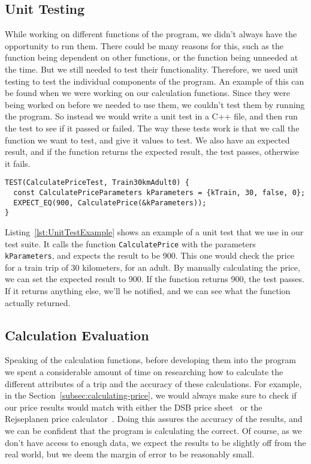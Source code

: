 \subsection{Unit Testing}\label{subsec:unit-testing}

While working on different functions of the program, we didn't always have the opportunity to run them.
There could be many reasons for this, such as the function being dependent on other functions, or the function being
unneeded at the time.
But we still needed to test their functionality.
Therefore, we used unit testing to test the individual components of the program.
An example of this can be found when we were working on our calculation functions.
Since they were being worked on before we needed to use them, we couldn't test them by running the program.
So instead we would write a unit test in a C++ file, and then run the test to see if it passed or failed.
The way these tests work is that we call the function we want to test, and give it values to test.
We also have an expected result, and if the function returns the expected result, the test passes, otherwise it fails.

\begin{lstlisting}[label={lst:UnitTestExample}, caption={Example of a unit test.}, captionpos=b]
TEST(CalculatePriceTest, Train30kmAdult0) {
  const CalculatePriceParameters kParameters = {kTrain, 30, false, 0};
  EXPECT_EQ(900, CalculatePrice(&kParameters));
}
\end{lstlisting}

Listing~\ref{lst:UnitTestExample} shows an example of a unit test that we use in our test suite.
It calls the function \texttt{CalculatePrice} with the parameters \texttt{kParameters}, and expects the result to be
900.
This one would check the price for a train trip of 30 kilometers, for an adult.
By manually calculating the price, we can set the expected result to 900.
If the function returns 900, the test passes.
If it returns anything else, we'll be notified, and we can see what the function actually returned.

\subsection{Calculation Evaluation}\label{subsec:calc-evaluation}

Speaking of the calculation functions, before developing them into the program we spent a considerable amount of time
on researching how to calculate the different attributes of a trip and the accuracy of these calculations.
For example, in the Section~\ref{subsec:calculating-price}, we would always make sure to check if our price results
would match with either the DSB price sheet~\cite{price_sheet} or the Rejseplanen price
calculator~\cite{price_calculator}.
Doing this assures the accuracy of the results, and we can be confident that the program is calculating the correct.
Of course, as we don't have access to enough data, we expect the results to be slightly off from the real world, but
we deem the margin of error to be reasonably small.

